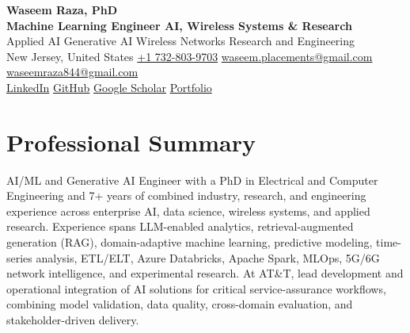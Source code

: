 \documentclass[9pt,letterpaper]{extarticle}
\begin{document}
\begin{center}
{\LARGE\bfseries Waseem Raza, PhD}\\[2pt]
{\large\bfseries Machine Learning Engineer \textbar{} AI, Wireless Systems \& Research}\\[1pt]
{\small Applied AI \textbar{} Generative AI \textbar{} Wireless Networks \textbar{} Research and Engineering}\\[3pt]
{\footnotesize New Jersey, United States \quad {}\enspace \href{tel:+17328039703}{+1 732-803-9703} \quad {}\enspace \href{mailto:waseem.placements@gmail.com}{waseem.placements@gmail.com} \textbar{} \href{mailto:waseemraza844@gmail.com}{waseemraza844@gmail.com}\\[1pt]\href{https://www.linkedin.com/in/waseem-raza-phd-9a737858/}{LinkedIn} \textbar{} \href{https://github.com/WaseemRaza844}{GitHub} \textbar{} \href{https://scholar.google.com/citations?user=d58Drr0AAAAJ\&hl=en}{Google Scholar} \textbar{} \href{https://waseemraza844.github.io/portfolio/}{Portfolio}}
\end{center}
\vspace{-5pt}
\section{Professional Summary}
AI/ML and Generative AI Engineer with a PhD in Electrical and Computer Engineering and 7+ years of combined industry, research, and engineering experience across enterprise AI, data science, wireless systems, and applied research. Experience spans LLM-enabled analytics, retrieval-augmented generation (RAG), domain-adaptive machine learning, predictive modeling, time-series analysis, ETL/ELT, Azure Databricks, Apache Spark, MLOps, 5G/6G network intelligence, and experimental research. At AT\&T, lead development and operational integration of AI solutions for critical service-assurance workflows, combining model validation, data quality, cross-domain evaluation, and stakeholder-driven delivery.
\end{document}
